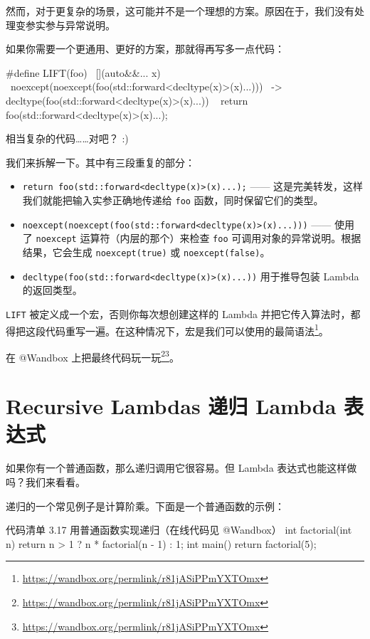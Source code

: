 然而，对于更复杂的场景，这可能并不是一个理想的方案。原因在于，我们没有处理变参实参与异常说明。

如果你需要一个更通用、更好的方案，那就得再写多一点代码：

\begin{codebox}
#define LIFT(foo) \
[](auto&&... x) \
noexcept(noexcept(foo(std::forward<decltype(x)>(x)...))) \
-> decltype(foo(std::forward<decltype(x)>(x)...)) \
{ return foo(std::forward<decltype(x)>(x)...); }
\end{codebox}

相当复杂的代码……对吧？ :)

我们来拆解一下。其中有三段重复的部分：

\begin{itemize}
\item \texttt{return foo(std::forward<decltype(x)>(x)...);} —— 这是完美转发，这样我们就能把输入实参正确地传递给 \texttt{foo} 函数，同时保留它们的类型。
\item \texttt{noexcept(noexcept(foo(std::forward<decltype(x)>(x)...)))} —— 使用了 \texttt{noexcept} 运算符（内层的那个）来检查 \texttt{foo} 可调用对象的异常说明。根据结果，它会生成 \texttt{noexcept(true)} 或 \texttt{noexcept(false)}。
\item \texttt{decltype(foo(std::forward<decltype(x)>(x)...))} 用于推导包装 Lambda 的返回类型。
\end{itemize}

\texttt{LIFT} 被定义成一个宏，否则你每次想创建这样的 Lambda 并把它传入算法时，都得把这段代码重写一遍。在这种情况下，宏是我们可以使用的最简语法\footnote{\url{https://wandbox.org/permlink/r81jASiPPmYXTOmx}}。

在 @Wandbox 上把最终代码玩一玩\footnote{\url{https://wandbox.org/permlink/r81jASiPPmYXTOmx}}\footnote{\url{https://wandbox.org/permlink/r81jASiPPmYXTOmx}}。

\section{Recursive Lambdas 递归 Lambda 表达式}

如果你有一个普通函数，那么递归调用它很容易。但 Lambda 表达式也能这样做吗？我们来看看。

递归的一个常见例子是计算阶乘。下面是一个普通函数的示例：

\begin{codeboxt}{代码清单 3.17 用普通函数实现递归（在线代码见 @Wandbox）}
int factorial(int n) {
return n > 1 ? n * factorial(n - 1) : 1;
}
int main() {
return factorial(5);
}
\end{codeboxt}

